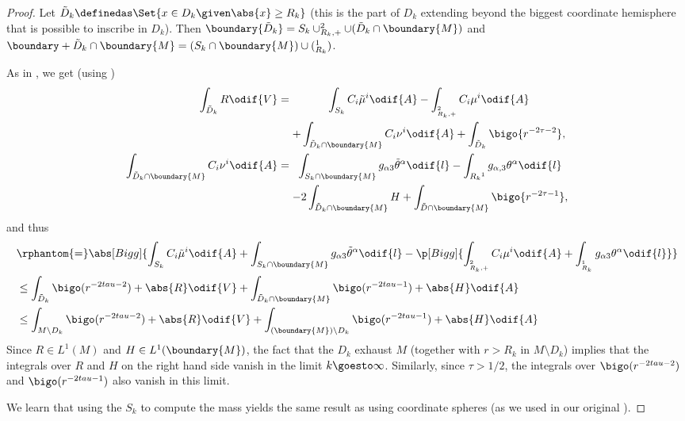 \documentclass[titlepage,numbers=noenddot,headinclude,oneside,%
footinclude=true,cleardoublepage=empty,%
BCOR=5mm,paper=a4,fontsize=11pt,%
english,%
]{scrartcl}
\let\sphere\relax
\newcommand{\sphere}{\mathbb{S}}
\begin{document}
\begin{proof}
    Let \( \tilde{D}_k\definedas \Set{x\in D_k\given \abs{x}\geq R_k} \) (this is the part of \( D_k \) extending beyond the biggest coordinate hemisphere that is possible to inscribe in \( D_k \)). Then \( \boundary{\tilde{D}_k}=S_k \cup \sphere^2_{R_k,+}\cup (\tilde{D}_k\cap \boundary{M}) \) and \( \boundary+{\tilde{D}_k\cap \boundary{M}}=(S_k\cap \boundary{M})\cup (\sphere^1_{R_k}) \).



    As in \cite[Proposition 3.7]{almarazPositiveMassTheorem2016}, we get (using \cite[Equations 3.16 and 3.17]{almarazPositiveMassTheorem2016})
    \begin{align*}
        \int_{\tilde{D}_k}{R}\odif{V}&=\begin{gathered}[t]
            \int_{S_k}C_i\tilde{\mu}^i \odif{A}-\int_{\sphere^2_{R_k,+}}C_i\mu^i\odif{A}\\
            +\int_{\tilde{D}_k \cap \boundary{M}}C_i\nu^i \odif{A}+\int_{\tilde{D}_k}\bigo{r^{-2\tau-2}},
        \end{gathered}\\
        \int_{\tilde{D}_k\cap \boundary{M}}C_i \nu^i\odif{A}&=\begin{gathered}[t]
            \int_{S_k\cap \boundary{M}}g_{\alpha 3}\tilde{\theta}^\alpha\odif{l}-\int_{\sphere{R_k}^1}g_{\alpha,3}\theta^\alpha\odif{l}\\
                -2\int_{\tilde{D}_k\cap \boundary{M}}H+\int_{\tilde{D}\cap \boundary{M}}\bigo{r^{-2\tau-1}},
        \end{gathered}
    \end{align*}
    and thus
    \begin{equation*}
        \begin{aligned}[t]
        &\rphantom{=}\abs[Bigg]{\int_{S_k}C_i \tilde{\mu}^i \odif{A}+\int_{S_k\cap \boundary{M}}g_{\alpha 3}\tilde{\theta}^\alpha\odif{l}-\p[Bigg]{\int_{\sphere^2_{R_k,+}}C_i\mu^i \odif{A}+\int_{\sphere^1_{R_k}}g_{\alpha 3}\theta^\alpha\odif{l}}}\\
        &\leq \int_{\tilde{D}_k}\bigo(r^{-2tau-2})+\abs{R}\odif{V}+\int_{\tilde{D}_k\cap \boundary{M}}\bigo(r^{-2tau-1})+\abs{H}\odif{A}\\
        &\leq \int_{M\setminus D_k}\bigo(r^{-2tau-2})+\abs{R}\odif{V}+\int_{(\boundary{M})\setminus D_k}\bigo(r^{-2tau-1})+\abs{H}\odif{A}\\
        \end{aligned}
    \end{equation*}
    Since \( R\in L^1(M) \) and \( H\in L^1(\boundary{M}) \), the fact that the \( D_k \) exhaust \( M \) (together with \( r>R_k \) in \( M\setminus D_k \)) implies that the integrals over \( R \) and \( H \) on the right hand side vanish in the limit \( k\goesto \infty \). Similarly, since \( \tau>1/2 \), the integrals over \( \bigo(r^{-2tau-2}) \) and \( \bigo(r^{-2tau-1}) \) also vanish in this limit. 
     
    We learn that using the \( S_k \) to compute the mass yields the same result as using coordinate spheres (as we used in our original ).
\end{proof}
\printbibliography
\end{document}
